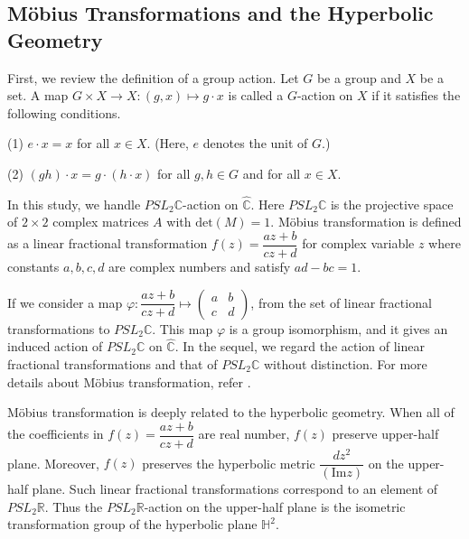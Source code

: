 \subsection{M\"obius Transformations and the Hyperbolic Geometry}

First, we review the definition of a group action. 
Let $G$ be a group and $X$ be a set. A map $G \times X \to X : (g,x) \mapsto g\cdot x$
is called a $G$-action on $X$ if it satisfies the following conditions.
\par \qquad (1) $e \cdot x = x$ for all $x \in X$. (Here, $e$ denotes the unit of $G$.)
\par \qquad (2) $(gh) \cdot x = g \cdot (h\cdot x)$ for all $g, h \in G$ and for all $x \in X$.

In this study, we handle $PSL_2\mathbb{C}$-action on $\hat{\mathbb{C}}$.
Here $PSL_2\mathbb{C}$ is the projective space of $2 \times 2$ complex matrices $A$ with $\mathrm{det}(M)=1$.
M\"obius transformation is defined as a linear fractional transformation
$f(z)=\dfrac{az+b}{cz+d}$ for complex variable $z$ where constants
$a, b, c, d$ are complex numbers and satisfy $ad - bc = 1$.

If we consider a map $\varphi: \dfrac{az+b}{cz+d} \mapsto \begin{pmatrix}a & b \\ c& d \end{pmatrix}$,
from the set of linear fractional transformations to $PSL_2\mathbb{C}$.
This map $\varphi$ is a group isomorphism, and it gives an induced action of $PSL_2\mathbb{C}$ on $\hat{\mathbb{C}}$.
In the sequel, we regard the action of linear fractional transformations
and that of $PSL_2\mathbb{C}$ without distinction.
For more details about M\"obius transformation, refer
\cite{MumfordSeriesWright200204}\cite{marden_2016}.

M\"obius transformation is deeply related to the hyperbolic geometry.
When all of the coefficients in $f(z) = \dfrac{az + b}{cz + d}$
are real number, $f(z)$ preserve upper-half plane.
Moreover, $f(z)$ preserves the hyperbolic metric $\dfrac{dz^2}{(\mathrm{Im}z)}$
on the upper-half plane.
Such linear fractional transformations correspond to an element of $PSL_2\mathbb{R}$.
Thus the $PSL_2\mathbb{R}$-action on the upper-half plane is
the isometric transformation group of the hyperbolic plane $\mathbb{H}^2$.

